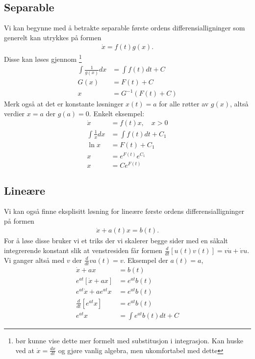 \subsection{Separable}
Vi kan begynne med å betrakte separable første ordens differensialligninger som generelt kan utrykkes på formen
\begin{align}
\dot{x}=f(t)g(x).
\end{align}
Disse kan løses gjennom \footnote{bør kunne vise dette mer formelt med substitusjon i integrasjon. Kan huske ved at $\dot{x}=\frac{dx}{dt}$ og gjøre vanlig algebra, men ukomfortabel med dette}
\begin{align}
\int\frac{1}{g(x)}dx &= \int f(t)dt + C \\
G(x) &= F(t) + C \\
x &= G^{-1}(F(t)+C)
\end{align}
Merk også at det er konstante løsninger $x(t)=a$ for alle røtter av $g(x)$, altså verdier $x=a$ der $g(a)=0$. Enkelt eksempel:
\begin{align}
\dot{x}&=f(t)x, \quad x>0 \\
\int \frac{1}{x}dx &= \int f(t)dt + C_1 \\
\ln x &= F(t)+C_1 \\
x &= e^{F(t)}e^{C_1} \\
x &= Ce^{F(t)} 
\end{align}
\subsection{Lineære}
Vi kan også finne eksplisitt løsning for lineære første ordens differensialligninger på formen
\begin{align}
\dot{x}+a(t)x=b(t).
\end{align}
For å løse disse bruker vi et triks der vi skalerer begge sider med en såkalt integrerende konstant slik at venstresiden får formen $\frac{d}{dt}[u(t)v(t)] = v\dot{u}+\dot{v}u$. Vi ganger altså med $v$ der $\frac{d}{dt}va(t)=v$.  Eksempel der $a(t)=a$,
\begin{align}
\dot{x}+ax&=b(t) \\
e^{at}[\dot{x}+ax]&=e^{at}b(t) \\
e^{at}\dot{x}+ae^{at}x &=e^{at}b(t) \\
\frac{d}{dt}[e^{at}x] &= e^{at}b(t) \\
e^{at}x &= \int e^{at}b(t)dt + C
\end{align}